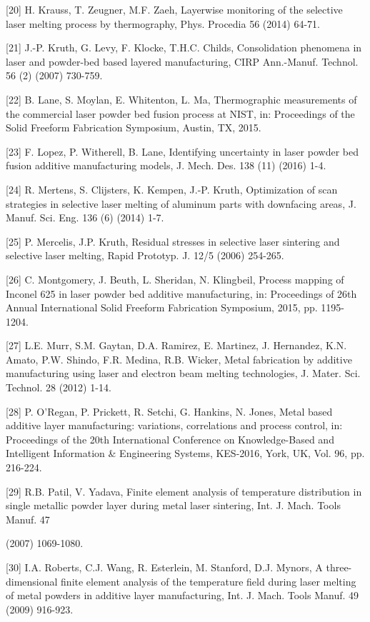 \documentclass[10pt]{article}
\begin{document}
[20] H. Krauss, T. Zeugner, M.F. Zaeh, Layerwise monitoring of the selective laser melting process by thermography, Phys. Procedia 56 (2014) 64-71.

[21] J.-P. Kruth, G. Levy, F. Klocke, T.H.C. Childs, Consolidation phenomena in laser and powder-bed based layered manufacturing, CIRP Ann.-Manuf. Technol. 56 (2) (2007) 730-759.

[22] B. Lane, S. Moylan, E. Whitenton, L. Ma, Thermographic measurements of the commercial laser powder bed fusion process at NIST, in: Proceedings of the Solid Freeform Fabrication Symposium, Austin, TX, 2015.

[23] F. Lopez, P. Witherell, B. Lane, Identifying uncertainty in laser powder bed fusion additive manufacturing models, J. Mech. Des. 138 (11) (2016) 1-4.

[24] R. Mertens, S. Clijsters, K. Kempen, J.-P. Kruth, Optimization of scan strategies in selective laser melting of aluminum parts with downfacing areas, J. Manuf. Sci. Eng. 136 (6) (2014) 1-7.

[25] P. Mercelis, J.P. Kruth, Residual stresses in selective laser sintering and selective laser melting, Rapid Prototyp. J. 12/5 (2006) 254-265.

[26] C. Montgomery, J. Beuth, L. Sheridan, N. Klingbeil, Process mapping of Inconel 625 in laser powder bed additive manufacturing, in: Proceedings of 26th Annual International Solid Freeform Fabrication Symposium, 2015, pp. 1195-1204.

[27] L.E. Murr, S.M. Gaytan, D.A. Ramirez, E. Martinez, J. Hernandez, K.N. Amato, P.W. Shindo, F.R. Medina, R.B. Wicker, Metal fabrication by additive manufacturing using laser and electron beam melting technologies, J. Mater. Sci. Technol. 28 (2012) 1-14.

[28] P. O’Regan, P. Prickett, R. Setchi, G. Hankins, N. Jones, Metal based additive layer manufacturing: variations, correlations and process control, in: Proceedings of the 20th International Conference on Knowledge-Based and Intelligent Information \& Engineering Systems, KES-2016, York, UK, Vol. 96, pp. 216-224.

[29] R.B. Patil, V. Yadava, Finite element analysis of temperature distribution in single metallic powder layer during metal laser sintering, Int. J. Mach. Tools Manuf. 47

(2007) 1069-1080.

[30] I.A. Roberts, C.J. Wang, R. Esterlein, M. Stanford, D.J. Mynors, A three-dimensional finite element analysis of the temperature field during laser melting of metal powders in additive layer manufacturing, Int. J. Mach. Tools Manuf. 49 (2009) 916-923.
\end{document}
